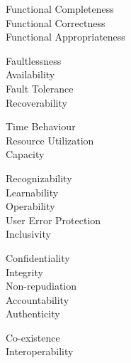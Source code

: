 \begin{tcbraster}[raster columns=3, raster equal height=rows, raster column skip=3mm, raster row skip=3mm]
  \begin{tcolorbox}[colback=q1!5, colframe=q1, title=\textbf{Functional Suitability}, fontupper=\small]
    \textbullet\ Functional Completeness\\\textbullet\ Functional Correctness\\\textbullet\ Functional Appropriateness
  \end{tcolorbox}
  \begin{tcolorbox}[colback=q2!5, colframe=q2, title=\textbf{Reliability}, fontupper=\small]
    \textbullet\ Faultlessness\\\textbullet\ Availability\\\textbullet\ Fault Tolerance\\\textbullet\ Recoverability
  \end{tcolorbox}
  \begin{tcolorbox}[colback=q3!5, colframe=q3, title=\textbf{Performance Efficiency}, fontupper=\small]
    \textbullet\ Time Behaviour\\\textbullet\ Resource Utilization\\\textbullet\ Capacity
  \end{tcolorbox}
  \begin{tcolorbox}[colback=q4!5, colframe=q4, title=\textbf{Usability}, fontupper=\small]
    \textbullet\ Recognizability\\\textbullet\ Learnability\\\textbullet\ Operability\\\textbullet\ User Error Protection\\\textbullet\ Inclusivity
  \end{tcolorbox}
  \begin{tcolorbox}[colback=q5!5, colframe=q5, title=\textbf{Security}, fontupper=\small]
    \textbullet\ Confidentiality\\\textbullet\ Integrity\\\textbullet\ Non-repudiation\\\textbullet\ Accountability\\\textbullet\ Authenticity
  \end{tcolorbox}
  \begin{tcolorbox}[colback=q6!5, colframe=q6, title=\textbf{Compatibility}, fontupper=\small]
    \textbullet\ Co-existence\\\textbullet\ Interoperability
  \end{tcolorbox}

\end{tcbraster}
